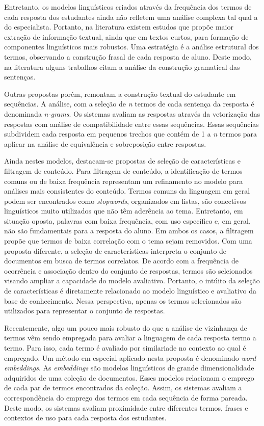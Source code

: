 Entretanto, os modelos linguísticos criados através da frequência dos termos de cada resposta dos estudantes ainda não refletem uma análise complexa tal qual a do especialista. Portanto, na literatura existem estudos que propõe maior extração de informação textual, ainda que em textos curtos, para formação de componentes linguísticos mais robustos. Uma estratégia é a análise estrutural dos termos, observando a construção frasal de cada resposta de aluno. Deste modo, na literatura alguns trabalhos citam a análise da construção gramatical das sentenças.

Outras propostas porém, remontam a construção textual do estudante em sequências. A análise, com a seleção de \textit{n} termos de cada sentença da resposta é denominada \textit{n-grams}. Os sistemas avaliam as respostas através da vetorização das respostas com análise de compatibilidade entre essas sequências. Essas sequências subdividem cada resposta em pequenos trechos que contém de 1 a \textit{n} termos para aplicar na análise de equivalência e sobreposição entre respostas. 

Ainda nestes modelos, destacam-se propostas de seleção de características e filtragem de conteúdo. Para filtragem de conteúdo, a identificação de termos comuns ou de baixa frequência representam um refinamento no modelo para análises mais consistentes do conteúdo. Termos comuns da linguagem em geral podem ser encontrados como \textit{stopwords}, organizados em listas, são conectivos linguísticos muito utilizados que não têm aderência ao tema. Entretanto, em situação oposta, palavras com baixa frequência, com uso específico e, em geral, não são fundamentais para a resposta do aluno. Em ambos os casos, a filtragem propõe que termos de baixa correlação com o tema sejam removidos. Com uma proposta diferente, a seleção de características interpreta o conjunto de documentos em busca de termos correlatos. De acordo com a frequência de ocorrência e associação dentro do conjunto de respostas, termos são selcionados visando ampliar a capacidade do modelo avaliativo. Portanto, o intúito da seleção de características é diretamente relacionado ao modelo linguístico e avaliativo da base de conhecimento. Nessa perspectiva, apenas os termos selecionados são utilizados para representar o conjunto de respostas.

Recentemente, algo um pouco mais robusto do que a análise de vizinhança de termos vêm sendo empregada para avaliar a linguagem de cada resposta termo a termo. Para isso, cada termo é avaliado por similariade no contexto ao qual é empregado. Um método em especial aplicado nesta proposta é denominado \textit{word embeddings}. As \textit{embeddings} são modelos linguísticos de grande dimensionalidade adquiridos de uma coleção de documentos. Esses modelos relacionam o emprego de cada par de termos encontrados da coleção. Assim, os sistemas avaliam a correspondência do emprego dos termos em cada sequência de forma pareada. Deste modo, os sistemas avaliam proximidade entre diferentes termos, frases e contextos de uso para cada resposta dos estudantes.

